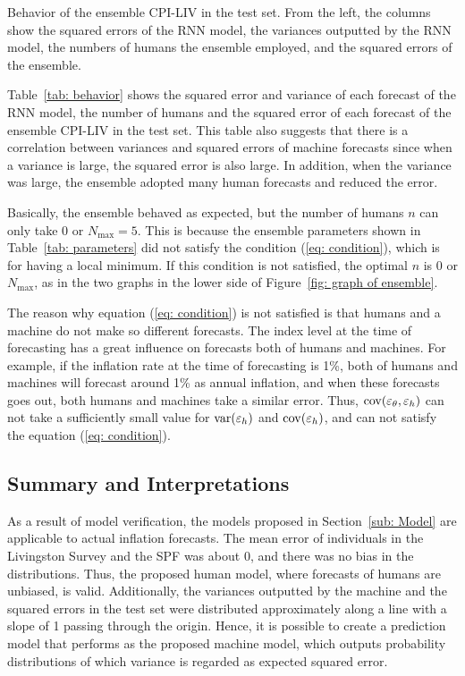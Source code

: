 \documentclass[../main.tex]{subfiles}
\begin{document}
\begin{table}[p]
  \caption{
    Behavior of the ensemble CPI-LIV in the test set.
    From the left, the columns show the squared errors of the RNN model, the variances outputted by the RNN model, the numbers of humans the ensemble employed, and the squared errors of the ensemble.
  }\label{tab: behavior}
  \begin{center}
    
  \end{center}
\end{table}

Table~\ref{tab: behavior} shows the squared error and variance of each forecast of the RNN model, the number of humans and the squared error of each forecast of the ensemble CPI-LIV in the test set.
This table also suggests that there is a correlation between variances and squared errors of machine forecasts since when a variance is large, the squared error is also large.
In addition, when the variance was large, the ensemble adopted many human forecasts and reduced the error.

Basically, the ensemble behaved as expected, but the number of humans $n$ can only take $0$ or $N_{\max} = 5$.
This is because the ensemble parameters shown in Table~\ref{tab: parameters} did not satisfy the condition (\ref{eq: condition}), which is for having a local minimum.
If this condition is not satisfied, the optimal $n$ is $0$ or $N_{\max}$, as in the two graphs in the lower side of Figure~\ref{fig: graph of ensemble}.

The reason why equation (\ref{eq: condition}) is not satisfied is that humans and a machine do not make so different forecasts.
The index level at the time of forecasting has a great influence on forecasts both of humans and machines.
For example, if the inflation rate at the time of forecasting is 1\%, both of humans and machines will forecast around 1\% as annual inflation, and when these forecasts goes out, both humans and machines take a similar error.
Thus, $\operatorname{cov}(\varepsilon_\theta, \varepsilon_h)$ can not take a sufficiently small value for $\operatorname{var}(\varepsilon_h)$ and $\operatorname{cov}(\varepsilon_h)$, and can not satisfy the equation (\ref{eq: condition}).

\subsection{Summary and Interpretations}
\label{sub: Summary and Interpretations}

As a result of model verification, the models proposed in Section~\ref{sub: Model} are applicable to actual inflation forecasts.
The mean error of individuals in the Livingston Survey and the SPF was about $0$, and there was no bias in the distributions.
Thus, the proposed human model, where forecasts of humans are unbiased, is valid.
Additionally, the variances outputted by the machine and the squared errors in the test set were distributed approximately along a line with a slope of 1 passing through the origin.
Hence, it is possible to create a prediction model that performs as the proposed machine model, which outputs probability distributions of which variance is regarded as expected squared error.
\end{document}
